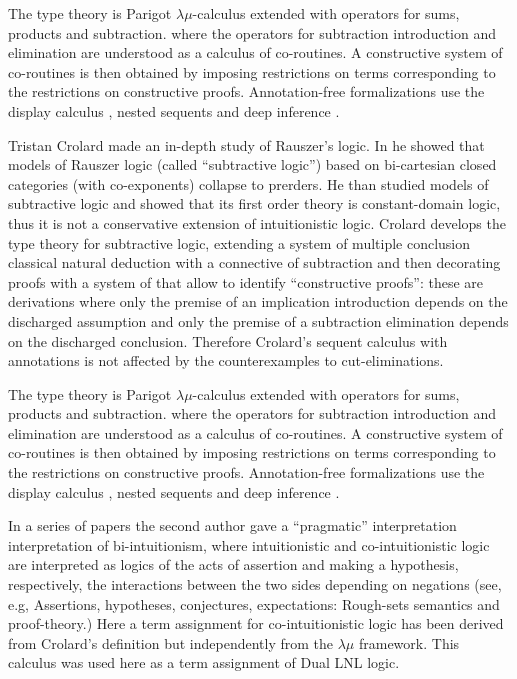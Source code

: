 The type theory is Parigot $\lambda\mu$-calculus extended with
operators for sums, products and subtraction.  where the operators for
subtraction introduction and elimination are understood as a calculus
of co-routines.  A constructive system of co-routines is then obtained
by imposing restrictions on terms corresponding to the restrictions on
constructive proofs.  Annotation-free formalizations use the display
calculus \cite{Gore:2000}, nested sequents
\cite{GorePostnieceTiu:2008} and deep inference \cite{Postniece:2009}.

Tristan Crolard \cite{Crolard:2001,Crolard:2004} made an in-depth
study of Rauszer's logic. In \cite{Crolard:2001} he showed that models
of Rauszer logic (called ``subtractive logic'') based on bi-cartesian
closed categories (with co-exponents) collapse to prerders.  He than
studied models of subtractive logic and showed that its first order
theory is constant-domain logic, thus it is not a conservative
extension of intuitionistic logic.  Crolard \cite{Crolard:2004}
develops the type theory for subtractive logic, extending a system of
multiple conclusion classical natural deduction with a connective of
subtraction and then decorating proofs with a system of
\cite{annotationsofdependencies} that allow to identify ``constructive
proofs'': these are derivations where only the premise of an
implication introduction depends on the discharged assumption and only
the premise of a subtraction elimination depends on the discharged
conclusion. Therefore Crolard's sequent calculus with annotations is
not affected by the counterexamples to cut-eliminations.

The type theory is Parigot $\lambda\mu$-calculus extended with
operators for sums, products and subtraction.  where the operators for
subtraction introduction and elimination are understood as a calculus
of co-routines.  A constructive system of co-routines is then obtained
by imposing restrictions on terms corresponding to the restrictions on
constructive proofs.  Annotation-free formalizations use the display
calculus \cite{Gore:2000}, nested sequents \cite{GorePostnieceTiu:2008}
and deep inference \cite{Postniece:2009}.

In a series of papers the second author gave a ``pragmatic''
interpretation interpretation of bi-intuitionism, where intuitionistic
and co-intuitionistic logic are interpreted as logics of the acts of
assertion and making a hypothesis, respectively, the interactions
between the two sides depending on negations (see, e.g,
\cite{Bellin:2014} Assertions, hypotheses, conjectures, expectations:
Rough-sets semantics and proof-theory.)  Here a term assignment for
co-intuitionistic logic has been derived from Crolard's definition but
independently from the $\lambda\mu$ framework. This calculus was used
here as a term assignment of Dual LNL logic.


